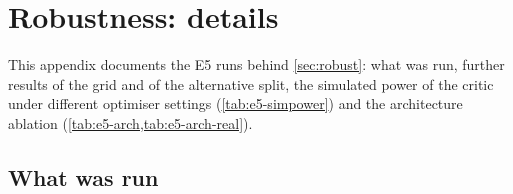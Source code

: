\section{Robustness: details}\label{app:robust}

This appendix documents the E5 runs behind \cref{sec:robust}: what was run, further results of
the grid and of the alternative split, the simulated power of the critic under different
optimiser settings (\cref{tab:e5-simpower}) and the architecture ablation
(\cref{tab:e5-arch,tab:e5-arch-real}).

\subsection{What was run}

